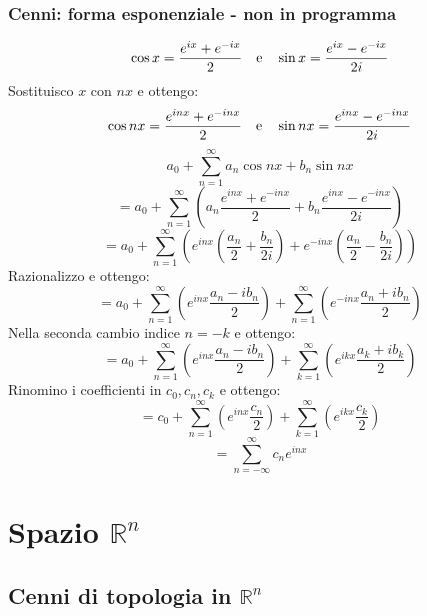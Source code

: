 \documentclass{scrreprt}
\begin{document}
\subsection{Cenni: forma esponenziale - non in programma}
\begin{equation}
	\cos{x} = \frac{e^{ix} + e^{-ix}}{2} \quad \textnormal{e} \quad \sin{x} = \frac{e^{ix} - e^{-ix}}{2i}
\end{equation}
Sostituisco $x$ con $nx$ e ottengo:
\begin{equation}
	\cos{nx} = \frac{e^{inx} + e^{-inx}}{2} \quad \textnormal{e} \quad \sin{nx} = \frac{e^{inx} - e^{-inx}}{2i}
\end{equation}
\begin{equation}
	a_0 + \sum_{n=1}^\infty a_n \cos{nx} + b_n \sin{nx}
\end{equation}
\begin{equation}
	= a_0 + \sum_{n=1}^\infty \left( a_n \frac{e^{inx} + e^{-inx}}{2} + b_n \frac{e^{inx} - e^{-inx}}{2i} \right)
\end{equation}
\begin{equation}
	= a_0 + \sum_{n=1}^\infty \left( e^{inx} \left( \frac{a_n}{2} + \frac{b_n}{2i} \right) + e^{-inx} \left( \frac{a_n}{2} - \frac{b_n}{2i} \right) \right)
\end{equation}
Razionalizzo e ottengo:
\begin{equation}
	= a_0 + \sum_{n=1}^\infty \left( e^{inx} \frac{a_n-ib_n}{2} \right) + \sum_{n=1}^\infty \left( e^{-inx} \frac{a_n+ib_n}{2} \right)
\end{equation}
Nella seconda cambio indice $n=-k$ e ottengo:
\begin{equation}
	= a_0 + \sum_{n=1}^\infty \left( e^{inx} \frac{a_n-ib_n}{2} \right) + \sum_{k=1}^\infty \left( e^{ikx} \frac{a_k+ib_k}{2} \right)
\end{equation}
Rinomino i coefficienti in $c_0, c_n, c_k$ e ottengo:
\begin{equation}
	= c_0 + \sum_{n=1}^\infty \left( e^{inx} \frac{c_n}{2} \right) + \sum_{k=1}^\infty \left( e^{ikx} \frac{c_k}{2} \right)
\end{equation}
\begin{equation}
	= \sum_{n=-\infty}^\infty c_n e^{inx}
\end{equation}


\chapter{Spazio $\mathbb{R}^n$}
\section{Cenni di topologia in $\mathbb{R}^n$}
\end{document}

